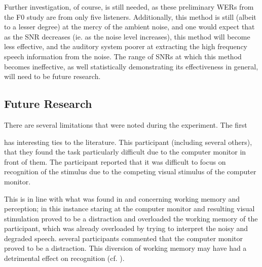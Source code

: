 Further investigation, of course, is still needed, as these preliminary WERs from the F0 study are from only five listeners.  Additionally, this method is still (albeit to a lesser degree) at the mercy of the ambient noise, and one would expect that as the SNR decreases (ie. as the noise level increases), this method will become less effective, and the auditory system poorer at extracting the high frequency speech information from the noise.  The range of SNRs at which this method becomes ineffective, as well statistically demonstrating its effectiveness in general, will need to be \DIFdelbegin {}\DIFdelend \DIFaddbegin {}\DIFaddend future research.

\DIFdelbegin %
\DIFdelend \DIFaddbegin \subsection{Future Research}\label{chap3:future-research}
\DIFaddend 

There are several limitations that were noted during the experiment.  The first \DIFdelbegin {}\DIFdelend \DIFaddbegin {}

\DIFaddend has interesting ties to the literature.  This participant (including several others), \DIFdelbegin {}\DIFdelend \DIFaddbegin {}\DIFaddend that they found the task particularly difficult due to the computer monitor in front of them.  The participant reported that it was difficult to focus on recognition of the stimulus due to the \DIFdelbegin {}\DIFdelend competing visual stimulus of the computer monitor.

This is in line with what was found in \cite{francis:09} and \cite{francis:10} concerning working memory and perception; in this instance staring at the computer monitor and resulting visual stimulation proved to be a distraction and overloaded the working memory of the participant, which was already overloaded by trying to interpret the noisy and degraded speech.  \DIFdelbegin {}\DIFdelend \DIFaddbegin {}\DIFaddend several participants commented that the computer monitor proved to be a distraction.  This diversion of working memory may have had a detrimental effect on recognition (cf. \cite{caplan:99})\DIFaddbegin {}\DIFaddend .


